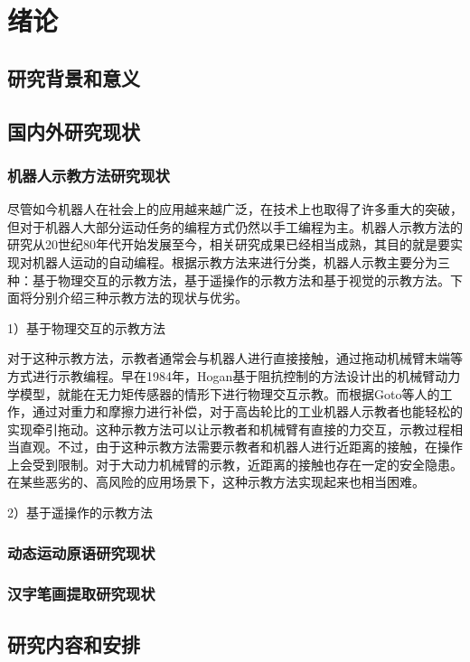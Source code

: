 \chapter{绪论}
\section{研究背景和意义}





\section{国内外研究现状}
\subsection{机器人示教方法研究现状}
尽管如今机器人在社会上的应用越来越广泛，在技术上也取得了许多重大的突破，但对于机器人大部分运动任务的编程方式仍然以手工编程为主\cite{Song2021}。机器人示教方法的研究从20世纪80年代开始发展至今，相关研究成果已经相当成熟，其目的就是要实现对机器人运动的自动编程\cite{Chen2020}。根据示教方法来进行分类，机器人示教主要分为三种：基于物理交互的示教方法，基于遥操作的示教方法和基于视觉的示教方法\cite{Zeng2019}。下面将分别介绍三种示教方法的现状与优劣。

1）基于物理交互的示教方法

对于这种示教方法，示教者通常会与机器人进行直接接触，通过拖动机械臂末端等方式进行示教编程。早在1984年，Hogan基于阻抗控制的方法设计出的机械臂动力学模型，就能在无力矩传感器的情形下进行物理交互示教\cite{Hogan1984a}。而根据Goto等人的工作，通过对重力和摩擦力进行补偿，对于高齿轮比的工业机器人示教者也能轻松的实现牵引拖动\cite{Goto2002}。这种示教方法可以让示教者和机械臂有直接的力交互，示教过程相当直观\cite{Zeng2019}。不过，由于这种示教方法需要示教者和机器人进行近距离的接触，在操作上会受到限制。对于大动力机械臂的示教，近距离的接触也存在一定的安全隐患。在某些恶劣的、高风险的应用场景下，这种示教方法实现起来也相当困难。

2）基于遥操作的示教方法



\subsection{动态运动原语研究现状}

\subsection{汉字笔画提取研究现状}

\section{研究内容和安排}


